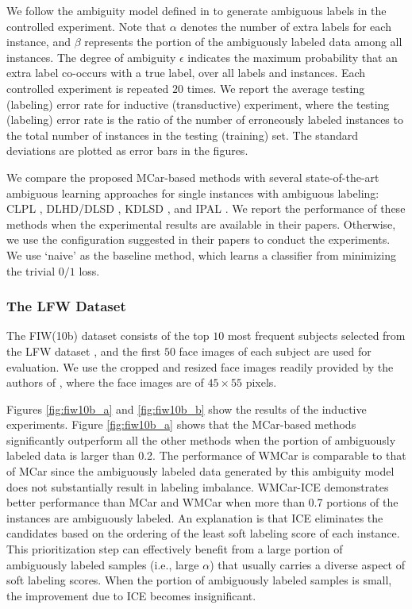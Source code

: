 \documentclass[10pt,journal,compsoc]{IEEEtran}
\begin{document}
We follow the ambiguity model defined in \cite{Cour2011} to generate ambiguous labels in the controlled experiment. Note that $\alpha$ denotes the number of extra labels for each instance, and $\beta$ represents the portion of the ambiguously labeled data among all instances. The degree of ambiguity $\epsilon$ indicates the maximum probability that an extra label co-occurs with a true label, over all labels and instances. Each controlled experiment is repeated $20$ times.
We report the average testing (labeling) error rate for inductive (transductive) experiment, where the testing (labeling) error rate is the ratio of the number of erroneously labeled instances to the total number of instances in the testing (training) set. The standard deviations are plotted as error bars in the figures.

We compare the proposed MCar-based methods with several state-of-the-art ambiguous learning approaches for single instances with ambiguous labeling: CLPL \cite{Cour2011}, DLHD/DLSD \cite{Chen2013}, KDLSD \cite{Chen2014all}, and IPAL \cite{Zhang2015stp}. We report the performance of these methods when the experimental results are available in their papers. Otherwise, we use the configuration suggested in their papers to conduct the experiments. We use `naive' \cite{Cour2011} as the baseline method, which learns a classifier from minimizing the trivial $0/1$ loss.




\subsubsection{The LFW Dataset}



The FIW(10b) dataset \cite{Cour2011} consists of the top $10$ most frequent subjects selected from the LFW dataset \cite{Huang2007}, and the first $50$ face images of each subject are used for evaluation.
We use the cropped and resized face images readily provided by the authors of \cite{Cour2011}, where the face images are of $45 \times 55$ pixels.


Figures \ref{fig:fiw10b_a} and \ref{fig:fiw10b_b} show the results of the inductive experiments. Figure \ref{fig:fiw10b_a} shows that the MCar-based methods significantly outperform all the other methods when the portion of ambiguously labeled data is larger than 0.2. The performance of WMCar is comparable to that of MCar since the ambiguously labeled data generated by this ambiguity model does not substantially result in labeling imbalance. WMCar-ICE demonstrates better performance than MCar and WMCar when more than 0.7 portions of the instances are ambiguously labeled.
An explanation is that ICE eliminates the candidates based on the ordering of the least soft labeling score of each instance. This prioritization step can effectively benefit from a large portion of ambiguously labeled samples (i.e., large $\alpha$) that usually carries a diverse aspect of soft labeling scores. When the portion of ambiguously labeled samples is small, the improvement due to ICE becomes insignificant.
\end{document}

